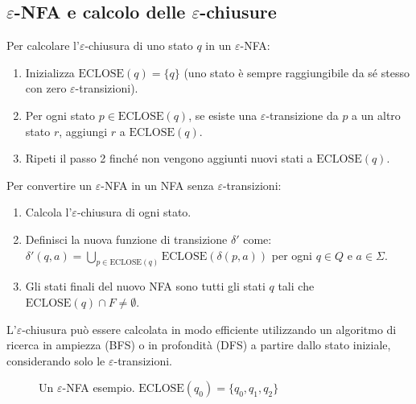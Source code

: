\documentclass[12pt,a4paper]{article}
\newcommand{\eclose}[1]{\text{ECLOSE}(#1)}
\begin{document}
\subsection{$\varepsilon$-NFA e calcolo delle $\varepsilon$-chiusure}

\begin{risoluzione}
Per calcolare l'$\varepsilon$-chiusura di uno stato $q$ in un $\varepsilon$-NFA:

\begin{enumerate}
  \item Inizializza $\eclose{q} = \{q\}$ (uno stato è sempre raggiungibile da sé stesso con zero $\varepsilon$-transizioni).
  \item Per ogni stato $p \in \eclose{q}$, se esiste una $\varepsilon$-transizione da $p$ a un altro stato $r$, aggiungi $r$ a $\eclose{q}$.
  \item Ripeti il passo 2 finché non vengono aggiunti nuovi stati a $\eclose{q}$.
\end{enumerate}

Per convertire un $\varepsilon$-NFA in un NFA senza $\varepsilon$-transizioni:

\begin{enumerate}
  \item Calcola l'$\varepsilon$-chiusura di ogni stato.
  \item Definisci la nuova funzione di transizione $\delta'$ come: $\delta'(q, a) = \bigcup_{p \in \eclose{q}} \eclose{\delta(p, a)}$ per ogni $q \in Q$ e $a \in \Sigma$.
  \item Gli stati finali del nuovo NFA sono tutti gli stati $q$ tali che $\eclose{q} \cap F \neq \emptyset$.
\end{enumerate}
\end{risoluzione}

\begin{suggerimento}
L'$\varepsilon$-chiusura può essere calcolata in modo efficiente utilizzando un algoritmo di ricerca in ampiezza (BFS) o in profondità (DFS) a partire dallo stato iniziale, considerando solo le $\varepsilon$-transizioni.
\end{suggerimento}

\begin{figure}[h]
\centering
{}
\caption{Un $\varepsilon$-NFA esempio. $\eclose{q_0} = \{q_0, q_1, q_2\}$}
\end{figure}
\end{document}
